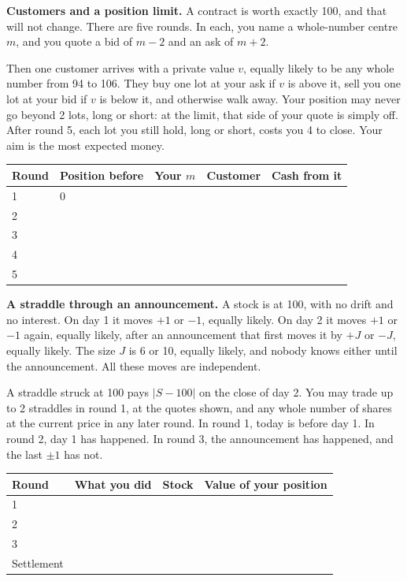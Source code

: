 \begin{question}\label{iq:iv2:played-games:8}
\textbf{Customers and a position limit.} A contract is worth exactly 100, and that will not change. There are five rounds. In each, you name a whole-number centre $m$, and you quote a bid of $m - 2$ and an ask of $m + 2$.

Then one customer arrives with a private value $v$, equally likely to be any whole number from 94 to 106. They buy one lot at your ask if $v$ is above it, sell you one lot at your bid if $v$ is below it, and otherwise walk away. Your position may never go beyond 2 lots, long or short: at the limit, that side of your quote is simply off. After round 5, each lot you still hold, long or short, costs you 4 to close. Your aim is the most expected money.

\medskip
\begin{tabular}{@{}l|l|l|l|l@{}}
Round & Position before & Your $m$ & Customer & Cash from it \\ \hline
1 & 0 & & & \\[8pt]\hline
2 & & & & \\[8pt]\hline
3 & & & & \\[8pt]\hline
4 & & & & \\[8pt]\hline
5 & & & & \\[8pt]\hline
\end{tabular}
\end{question}
\vfill\clearpage

\begin{question}\label{iq:iv2:played-games:9}
\textbf{A straddle through an announcement.} A stock is at 100, with no drift and no interest. On day 1 it moves $+1$ or $-1$, equally likely. On day 2 it moves $+1$ or $-1$ again, equally likely, after an announcement that first moves it by $+J$ or $-J$, equally likely. The size $J$ is 6 or 10, equally likely, and nobody knows either until the announcement. All these moves are independent.

A straddle struck at 100 pays $|S - 100|$ on the close of day 2. You may trade up to 2 straddles in round 1, at the quotes shown, and any whole number of shares at the current price in any later round. In round 1, today is before day 1. In round 2, day 1 has happened. In round 3, the announcement has happened, and the last $\pm 1$ has not.

\medskip
\begin{tabular}{@{}l|p{4cm}|l|l@{}}
Round & What you did & Stock & Value of your position \\ \hline
1 & & & \\[8pt]\hline
2 & & & \\[8pt]\hline
3 & & & \\[8pt]\hline
Settlement & & & \\[8pt]\hline
\end{tabular}
\end{question}
\vfill\clearpage

